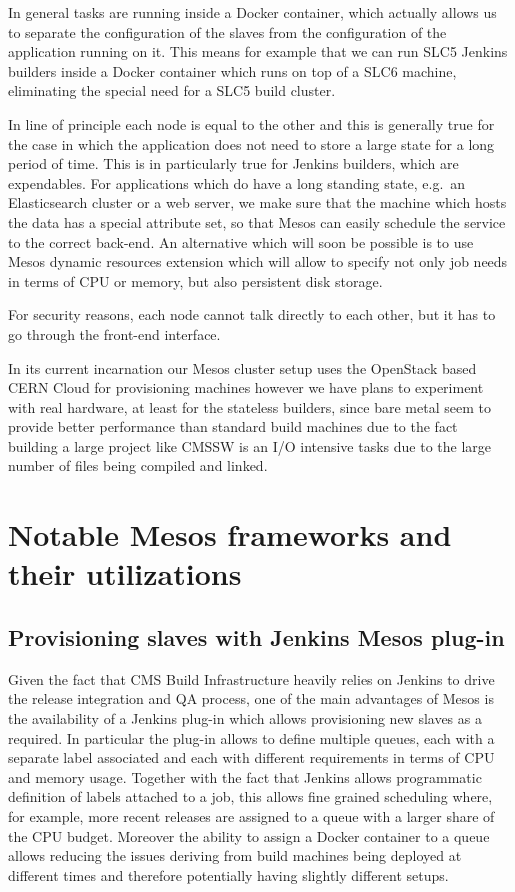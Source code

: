 \documentclass[a4paper]{jpconf}
\begin{document}
In general tasks are running inside a Docker container, which actually allows us
to separate the configuration of the slaves from the configuration of the
application running on it. This means for example that we can run SLC5 Jenkins
builders inside a Docker container which runs on top of a SLC6 machine,
eliminating the special need for a SLC5 build cluster.

In line of principle each node is equal to the other and this is
generally true for the case in which the application does not need to
store a large state for a long period of time. This is in particularly
true for Jenkins builders, which are expendables. For applications which
do have a long standing state, e.g.\ an Elasticsearch cluster or a web
server, we make sure that the machine which hosts the data has a
special attribute set, so that Mesos can easily schedule the service
to the correct back-end. An alternative which will soon be possible is
to use Mesos dynamic resources extension which will allow to specify
not only job needs in terms of CPU or memory, but also persistent disk
storage.

For security reasons, each node cannot talk directly to each other, but
it has to go through the front-end interface.

In its current incarnation our Mesos cluster setup uses the OpenStack based CERN
Cloud for provisioning machines however we have plans to experiment with real
hardware, at least for the stateless builders, since bare metal seem to provide
better performance than standard build machines due to the fact building a large
project like CMSSW is an I/O intensive tasks due to the large number of files
being compiled and linked.

\section{Notable Mesos frameworks and their utilizations}

\subsection{Provisioning slaves with Jenkins Mesos plug-in}

Given the fact that CMS Build Infrastructure heavily relies on Jenkins
to drive the release integration and QA process, one of the main
advantages of Mesos is the availability of a Jenkins plug-in which allows
provisioning new slaves as a required. In particular the plug-in allows
to define multiple queues, each with a separate label associated and
each with different requirements in terms of CPU and memory usage.
Together with the fact that Jenkins allows programmatic definition of
labels attached to a job, this allows fine grained scheduling where,
for example, more recent releases are assigned to a queue with a larger
share of the CPU budget. Moreover the ability to assign a Docker
container to a queue allows reducing the issues deriving from build
machines being deployed at different times and therefore potentially
having slightly different setups.
\end{document}
